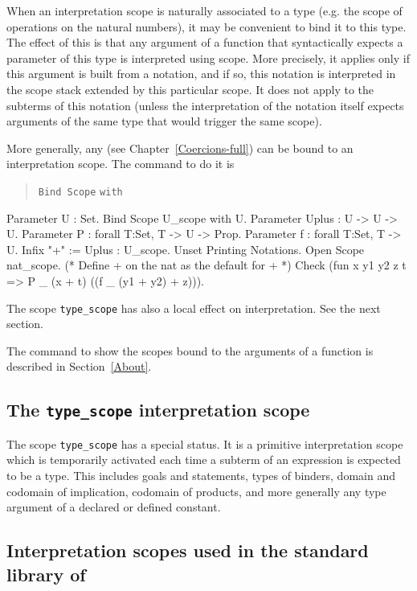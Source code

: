 When an interpretation scope is naturally associated to a type
(e.g. the scope of operations on the natural numbers), it may be
convenient to bind it to this type. The effect of this is that any
argument of a function that syntactically expects a parameter of this
type is interpreted using scope. More precisely, it applies only if
this argument is built from a notation, and if so, this notation is
interpreted in the scope stack extended by this particular scope.  It
does not apply to the subterms of this notation (unless the
interpretation of the notation itself expects arguments of the same
type that would trigger the same scope).

More generally, any {\class} (see Chapter~\ref{Coercions-full}) can be
bound to an interpretation scope. The command to do it is
\begin{quote}
{\tt Bind Scope} {\scope} \texttt{with} {\class}
\end{quote}

\Example
\begin{coq_example}
Parameter U : Set.
Bind Scope U_scope with U.
Parameter Uplus : U -> U -> U.
Parameter P : forall T:Set, T -> U -> Prop.
Parameter f : forall T:Set, T -> U.
Infix "+" := Uplus : U_scope.
Unset Printing Notations.
Open Scope nat_scope. (* Define + on the nat as the default for + *)
Check (fun x y1 y2 z t => P _ (x + t) ((f _ (y1 + y2) + z))).
\end{coq_example}

\Rem The scope {\tt type\_scope} has also a local effect on
interpretation. See the next section.

\SeeAlso The command to show the scopes bound to the arguments of a
function is described in Section~\ref{About}.

\subsection[The {\tt type\_scope} interpretation scope]{The {\tt type\_scope} interpretation scope}

The scope {\tt type\_scope} has a special status. It is a primitive
interpretation scope which is temporarily activated each time a
subterm of an expression is expected to be a type. This includes goals
and statements, types of binders, domain and codomain of implication,
codomain of products, and more generally any type argument of a
declared or defined constant.

\subsection{Interpretation scopes used in the standard library of {\Coq}}

